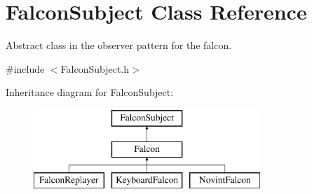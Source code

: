 \hypertarget{classFalconSubject}{
\section{FalconSubject Class Reference}
\label{classFalconSubject}
}


Abstract class in the observer pattern for the falcon.  




{\ttfamily \#include $<$FalconSubject.h$>$}

Inheritance diagram for FalconSubject:\begin{figure}[H]
\begin{center}
\leavevmode
\includegraphics[height=3.000000cm]{classFalconSubject}
\end{center}
\end{figure}

